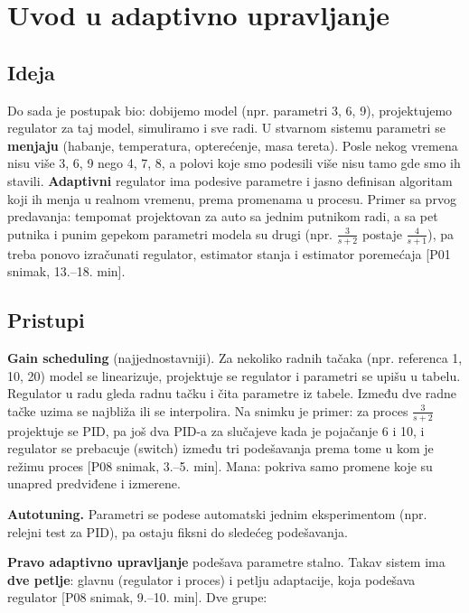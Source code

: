 \documentclass[11pt,a4paper,parskip=half,headsepline,numbers=noenddot]{scrartcl}
\DeclareRobustCommand{\izvor}[1]{{\small\color{izvorC}[#1]}}
\begin{document}
\section{Uvod u adaptivno upravljanje}

\subsection{Ideja}

Do sada je postupak bio: dobijemo model (npr. parametri 3, 6, 9), projektujemo regulator za taj model, simuliramo i sve radi. U stvarnom sistemu parametri se \textbf{menjaju} (habanje, temperatura, opterećenje, masa tereta). Posle nekog vremena nisu više 3, 6, 9 nego 4, 7, 8, a polovi koje smo podesili više nisu tamo gde smo ih stavili. \textbf{Adaptivni} regulator ima podesive parametre i jasno definisan algoritam koji ih menja u realnom vremenu, prema promenama u procesu. Primer sa prvog predavanja: tempomat projektovan za auto sa jednim putnikom radi, a sa pet putnika i punim gepekom parametri modela su drugi (npr. \(\frac{3}{s+2}\) postaje \(\frac{4}{s+1}\)), pa treba ponovo izračunati regulator, estimator stanja i estimator poremećaja \izvor{P01 snimak, 13.--18. min}.

\subsection{Pristupi}

\textbf{Gain scheduling} (najjednostavniji). Za nekoliko radnih tačaka (npr. referenca 1, 10, 20) model se linearizuje, projektuje se regulator i parametri se upišu u tabelu. Regulator u radu gleda radnu tačku i čita parametre iz tabele. Između dve radne tačke uzima se najbliža ili se interpolira. Na snimku je primer: za proces \(\frac{3}{s+2}\) projektuje se PID, pa još dva PID-a za slučajeve kada je pojačanje 6 i 10, i regulator se prebacuje (switch) između tri podešavanja prema tome u kom je režimu proces \izvor{P08 snimak, 3.--5. min}. Mana: pokriva samo promene koje su unapred predviđene i izmerene.

\textbf{Autotuning.} Parametri se podese automatski jednim eksperimentom (npr. relejni test za PID), pa ostaju fiksni do sledećeg podešavanja.

\textbf{Pravo adaptivno upravljanje} podešava parametre stalno. Takav sistem ima \textbf{dve petlje}: glavnu (regulator i proces) i petlju adaptacije, koja podešava regulator \izvor{P08 snimak, 9.--10. min}. Dve grupe:
\end{document}
